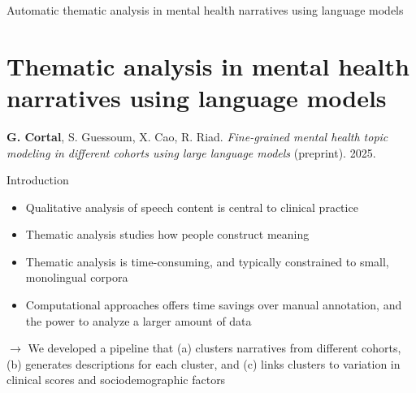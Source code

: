 \documentclass[10pt]{beamer}
\begin{document}
\begin{frame}{}
\Large
\begin{center}
    Automatic thematic analysis in mental health narratives using language models%
    \section{Thematic analysis in mental health narratives using language models}
\end{center}

\vspace{1.5cm}

\footnotesize

\textbf{G. Cortal}, S. Guessoum, X. Cao, R. Riad. \textit{Fine-grained mental health topic modeling in different cohorts using large language models} (preprint). 2025. 

\end{frame}

\begin{frame}{Introduction}

  \begin{itemize}[<+->]
    \item Qualitative analysis of speech content is central to clinical practice
    \item Thematic analysis studies how people construct meaning%
    \item Thematic analysis is time-consuming, and typically constrained to small, monolingual corpora
    \item Computational approaches offers time savings over manual annotation, and the power to analyze a larger amount of data
  \end{itemize}

  \pause
  \vspace{0.5cm}

  $\rightarrow$ We developed a pipeline that (a) clusters narratives from different cohorts, (b) generates descriptions for each cluster, and (c) links clusters to variation in clinical scores and sociodemographic factors %

\end{frame}
\end{document}
